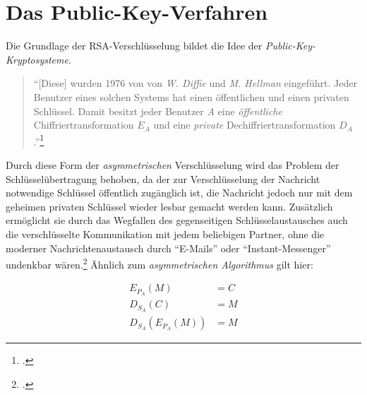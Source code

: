 \documentclass{scrarticle}
\begin{document}
        \section[Public-Key-Verfahren]{Das Public-Key-Verfahren}
        Die Grundlage der RSA-Verschlüsselung bildet die Idee der \emph{Public-Key-Kryptosysteme}.

        \begin{quote}
            \enquote{[Diese] wurden 1976 von von \emph{W. Diffie} und \emph{M. Hellman} eingeführt. Jeder Benutzer eines solchen Systems hat einen öffentlichen und einen privaten Schlüssel. Damit besitzt jeder Benutzer \emph{A} eine \emph{öffentliche} Chiffriertransformation $E_A$ und eine \emph{private} Dechiffriertransformation $D_A$.}\footcite[vgl.][67]{watjen2008}
        \end{quote}
        Durch diese Form der \emph{asymmetrischen} Verschlüsselung wird das Problem der Schlüsselübertragung behoben, da der zur Verschlüsselung der Nachricht notwendige Schlüssel öffentlich zugänglich ist, die Nachricht jedoch nur mit dem geheimen privaten Schlüssel wieder lesbar gemacht werden kann. Zusätzlich ermöglicht sie durch das Wegfallen des gegenseitigen Schlüsselaustausches auch die verschlüsselte Kommunikation mit jedem beliebigen Partner, ohne die moderner Nachrichtenaustausch durch \enquote{E-Mails} oder \enquote{Instant-Messenger} undenkbar wären.\footcite[vgl.][21]{ertel2003} Ähnlich zum \emph{asymmetrischen Algorithmus} gilt hier:

        \begin{align}
            E_{P_A}(M) &= C \\
            D_{S_A}(C) &= M \\
            D_{S_A}\left(E_{P_A}(M)\right) &= M
        \end{align}
\end{document}
